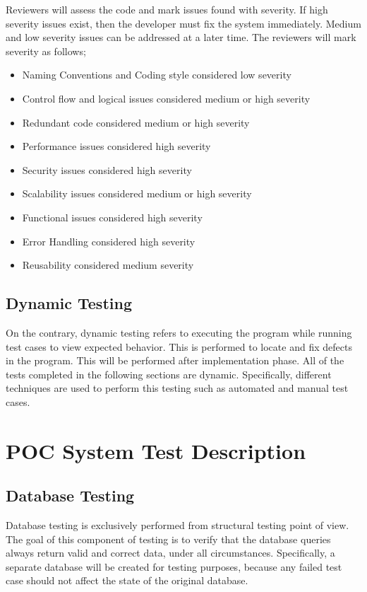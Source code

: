 \documentclass[12pt]{article}
\begin{document}
Reviewers will assess the code and mark issues found with severity. If high severity issues exist, then the developer must fix the system immediately. Medium and low severity issues can be addressed at a later time. The reviewers will mark severity as follows;
\begin{itemize}
\item Naming Conventions and Coding style considered low severity
\item Control flow and logical issues considered medium or high severity
\item Redundant code considered medium or high severity
\item Performance issues considered high severity
\item Security issues considered high severity
\item Scalability issues considered medium or high severity
\item Functional issues considered high severity
\item Error Handling considered high severity
\item Reusability considered medium severity
\end{itemize}

\subsection{Dynamic Testing}
On the contrary, dynamic testing refers to executing the program while running test cases to view expected behavior. This is performed to locate and fix defects in the program. This will be performed after implementation phase. All of the tests completed in the following sections are dynamic. Specifically, different techniques are used to perform this testing such as automated and manual test cases. 

%
%

\section{POC System Test Description}

\subsection{Database Testing}
Database testing is exclusively performed from structural testing point of view. The goal of this component of testing is to verify that the database queries always return valid and correct data, under all circumstances. Specifically, a separate database will be created for testing purposes, because any failed test case should not affect the state of the original database. 
\end{document}
